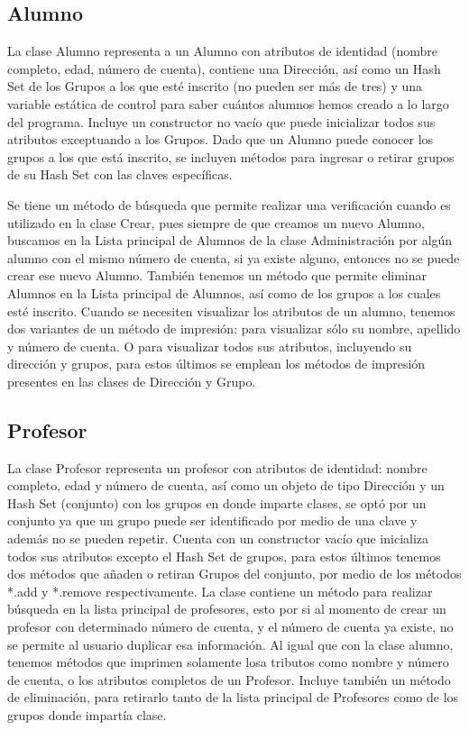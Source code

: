 \documentclass[11pt]{article}
\begin{document}
\subsection{Alumno}
\par

La clase Alumno representa a un Alumno con atributos de identidad (nombre completo, edad, número de cuenta), contiene una Dirección, así como un Hash Set de los Grupos a los que esté inscrito (no pueden ser más de tres) y una variable estática de control para saber cuántos alumnos hemos creado a lo largo del programa. Incluye un constructor no vacío que puede inicializar todos sus atributos exceptuando a los Grupos. Dado que un Alumno puede conocer los grupos a los que está inscrito, se incluyen métodos para ingresar o retirar grupos de su Hash Set con las claves específicas. 
\par
Se tiene un método de búsqueda que permite realizar una verificación cuando es utilizado en la clase Crear, pues siempre de que creamos un nuevo Alumno, buscamos en la Lista principal de Alumnos de la clase Administración por algún alumno con el mismo número de cuenta, si ya existe alguno, entonces no se puede crear ese nuevo Alumno. También tenemos un método que permite eliminar Alumnos en la Lista principal de Alumnos, así como de los grupos a los cuales esté inscrito. Cuando se necesiten visualizar los atributos de un alumno, tenemos dos variantes de un método de impresión: para visualizar sólo su nombre, apellido y número de cuenta. O para visualizar todos sus atributos, incluyendo su dirección y grupos, para estos últimos se emplean los métodos de impresión presentes en las clases de Dirección y Grupo.

\subsection{Profesor}
\par

La clase Profesor representa un profesor con atributos de identidad: nombre completo, edad y número de cuenta, así como un objeto de tipo Dirección y un Hash Set (conjunto) con los grupos en donde imparte clases, se optó por un conjunto ya que un grupo puede ser identificado por medio de una clave y además no se pueden repetir. Cuenta con un constructor vacío que inicializa todos sus atributos excepto el Hash Set de grupos, para estos últimos tenemos dos métodos que añaden o retiran Grupos del conjunto, por medio de los métodos *.add y *.remove respectivamente. La clase contiene un método para realizar búsqueda en la lista principal de profesores, esto por si al momento de crear un profesor con determinado número de cuenta, y el número de cuenta ya existe, no se permite al usuario duplicar esa información. Al igual que con la clase alumno, tenemos métodos que imprimen solamente losa tributos como nombre y número de cuenta, o los atributos completos de un Profesor. Incluye también un método de eliminación, para retirarlo tanto de la lista principal de Profesores como de los grupos donde impartía clase.
\end{document}
